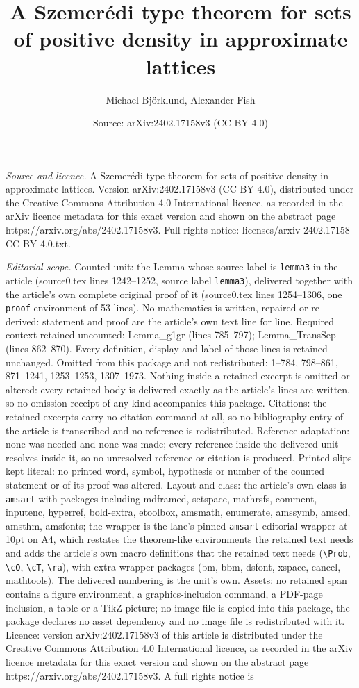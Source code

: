 \documentclass[10pt,a4paper]{amsart}
\title[A Szemer\'edi type theorem for sets of positive density in a]{A Szemer\'edi type theorem for sets of positive density in approximate lattices}
\author{Michael Bj\"orklund, Alexander Fish}
\date{Source: arXiv:2402.17158v3 (CC BY 4.0)}
\begin{document}
\maketitle

\noindent\emph{Source and licence.} A Szemer\'edi type theorem for sets of positive density in approximate lattices. Version arXiv:2402.17158v3 (CC BY 4.0), distributed under the Creative Commons Attribution 4.0 International licence, as recorded in the arXiv licence metadata for this exact version and shown on the abstract page https://arxiv.org/abs/2402.17158v3. Full rights notice: licenses/arxiv-2402.17158-CC-BY-4.0.txt.\par\smallskip

\noindent\textit{Editorial scope.} Counted unit: the Lemma whose source label is \texttt{lemma3} in the article (source0.tex lines 1242--1252, source label \texttt{lemma3}), delivered together with the article's own complete original proof of it (source0.tex lines 1254--1306, one \texttt{proof} environment of 53 lines). No mathematics is written, repaired or re-derived: statement and proof are the article's own text line for line. Required context retained uncounted: Lemma\_g1gr (lines 785--797); Lemma\_TransSep (lines 862--870). Every definition, display and label of those lines is retained unchanged. Omitted from this package and not redistributed: 1--784, 798--861, 871--1241, 1253--1253, 1307--1973. Nothing inside a retained excerpt is omitted or altered: every retained body is delivered exactly as the article's lines are written, so no omission receipt of any kind accompanies this package. Citations: the retained excerpts carry no citation command at all, so no bibliography entry of the article is transcribed and no reference is redistributed. Reference adaptation: none was needed and none was made; every reference inside the delivered unit resolves inside it, so no unresolved reference or citation is produced. Printed slips kept literal: no printed word, symbol, hypothesis or number of the counted statement or of its proof was altered. Layout and class: the article's own class is \texttt{amsart} with packages including mdframed, setspace, mathrsfs, comment, inputenc, hyperref, bold-extra, etoolbox, amsmath, enumerate, amssymb, amscd, amsthm, amsfonts; the wrapper is the lane's pinned \texttt{amsart} editorial wrapper at 10pt on A4, which restates the theorem-like environments the retained text needs and adds the article's own macro definitions that the retained text needs (\texttt{\textbackslash Prob}, \texttt{\textbackslash cO}, \texttt{\textbackslash cT}, \texttt{\textbackslash ra}), with extra wrapper packages (bm, bbm, dsfont, xspace, cancel, mathtools). The delivered numbering is the unit's own. Assets: no retained span contains a figure environment, a graphics-inclusion command, a PDF-page inclusion, a table or a TikZ picture; no image file is copied into this package, the package declares no asset dependency and no image file is redistributed with it. Licence: version arXiv:2402.17158v3 of this article is distributed under the Creative Commons Attribution 4.0 International licence, as recorded in the arXiv licence metadata for this exact version and shown on the abstract page https://arxiv.org/abs/2402.17158v3. A full rights notice is 
\end{document}
